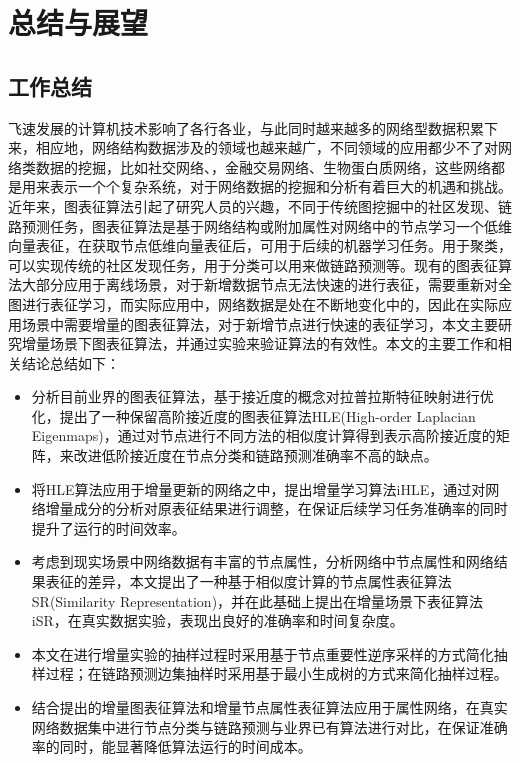 \chapter{总结与展望}

\section{工作总结}
飞速发展的计算机技术影响了各行各业，与此同时越来越多的网络型数据积累下来，相应地，网络结构数据涉及的领域也越来越广，不同领域的应用都少不了对网络类数据的挖掘，比如社交网络、，金融交易网络、生物蛋白质网络，这些网络都是用来表示一个个复杂系统，对于网络数据的挖掘和分析有着巨大的机遇和挑战。近年来，图表征算法引起了研究人员的兴趣，不同于传统图挖掘中的社区发现、链路预测任务，图表征算法是基于网络结构或附加属性对网络中的节点学习一个低维向量表征，在获取节点低维向量表征后，可用于后续的机器学习任务。用于聚类，可以实现传统的社区发现任务，用于分类可以用来做链路预测等。现有的图表征算法大部分应用于离线场景，对于新增数据节点无法快速的进行表征，需要重新对全图进行表征学习，而实际应用中，网络数据是处在不断地变化中的，因此在实际应用场景中需要增量的图表征算法，对于新增节点进行快速的表征学习，本文主要研究增量场景下图表征算法，并通过实验来验证算法的有效性。本文的主要工作和相关结论总结如下：
\begin{itemize}
	\item 分析目前业界的图表征算法，基于接近度的概念对拉普拉斯特征映射进行优化，提出了一种保留高阶接近度的图表征算法HLE(High-order Laplacian Eigenmaps)，通过对节点进行不同方法的相似度计算得到表示高阶接近度的矩阵，来改进低阶接近度在节点分类和链路预测准确率不高的缺点。
	\item 将HLE算法应用于增量更新的网络之中，提出增量学习算法iHLE，通过对网络增量成分的分析对原表征结果进行调整，在保证后续学习任务准确率的同时提升了运行的时间效率。
	\item 考虑到现实场景中网络数据有丰富的节点属性，分析网络中节点属性和网络结果表征的差异，本文提出了一种基于相似度计算的节点属性表征算法SR(Similarity Representation)，并在此基础上提出在增量场景下表征算法iSR，在真实数据实验，表现出良好的准确率和时间复杂度。		
	\item 本文在进行增量实验的抽样过程时采用基于节点重要性逆序采样的方式简化抽样过程；在链路预测边集抽样时采用基于最小生成树的方式来简化抽样过程。
	\item 结合提出的增量图表征算法和增量节点属性表征算法应用于属性网络，在真实网络数据集中进行节点分类与链路预测与业界已有算法进行对比，在保证准确率的同时，能显著降低算法运行的时间成本。

\end{itemize}
